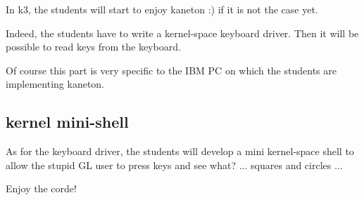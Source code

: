 In k3, the students will start to enjoy kaneton :) if it is not the
case yet.

Indeed, the students have to write a kernel-space keyboard driver.
Then it will be possible to read keys from the keyboard.

Of course this part is very specific to the IBM PC on which the students
are implementing kaneton.

\subsection{kernel mini-shell}

As for the keyboard driver, the students will develop a mini kernel-space
shell to allow the stupid GL user to press keys and see what? ... squares
and circles ...

Enjoy the corde!
